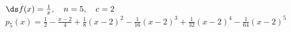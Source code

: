 {$\ds f(x) = \frac1x, \quad n=5, \quad c=2$
}
{$p_5(x) = \frac{1}{2}-\frac{x-2}{4}+\frac{1}{8} (x-2)^2-\frac{1}{16}
   (x-2)^3+\frac{1}{32} (x-2)^4-\frac{1}{64} (x-2)^5$
}